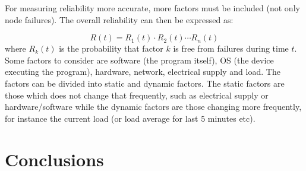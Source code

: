 \documentclass{cslthse-msc}
\begin{document}
For measuring reliability more accurate, more factors must be included (not only node failures). The overall reliability can then be expressed as:

\begin{equation} \label{eq:overall_reliability}
R(t) = R_{1}(t) \cdot R_{2}(t) \cdots R_{n}(t)
\end{equation}
where $R_{k}(t)$ is the probability that factor $k$ is free from failures during time $t$. Some factors to consider are software (the program itself), OS (the device executing the program), hardware, network, electrical supply and load. The factors can be divided into static and dynamic factors. The static factors are those which does not change that frequently, such as electrical supply or hardware/software while the dynamic factors are those changing more frequently, for instance the current load (or load average for last 5 minutes etc). 


\chapter{Conclusions} \label{ch:conclusions}
\end{document}
